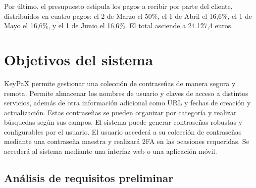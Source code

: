 \documentclass{article}
\begin{document}
Por último, el presupuesto estipula los pagos a recibir por parte del cliente, distribuidos en cuatro pagos: el 2 de Marzo el 50\%, el 1 de Abril el 16,6\%, el 1 de Mayo el 16,6\%, y el 1 de Junio el 16,6\%. El total asciende a 24.127,4 euros.


\pagebreak

\tableofcontents

\pagebreak

\section{Objetivos del sistema}


KeyPaX permite gestionar una colección de contraseñas de manera segura y remota. Permite almacenar los nombres de usuario y claves de acceso a distintos servicios, además de otra información adicional como URL y fechas de creación y actualización. Estas contraseñas se pueden organizar por categoría y realizar búsquedas según sus campos. El sistema puede generar contraseñas robustas y configurables por el usuario. El usuario accederá a su colección de contraseñas mediante una contraseña maestra y realizará 2FA en las ocasiones requeridas. Se accederá al sistema mediante una interfaz web o una aplicación móvil.

\subsection{Análisis de requisitos preliminar}
\end{document}
